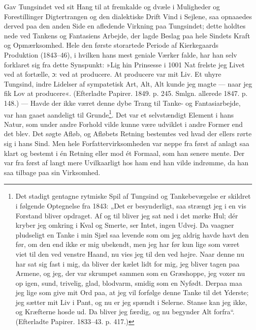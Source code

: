 \documentclass[12pt,a4paper,openany]{book}
\newcommand{\opage}[1]{\marginnote{\footnotesize\textit{[#1]}}}
\begin{document}
Gav Tungsindet ved sit Hang til at fremkalde og
dvæle i Muligheder og Forestillinger Digtertrangen og
den dialektiske Drift Vind i Sejlene, saa opnaaedes derved
paa den anden Side en afledende Virkning paa Tungsindet;
dette holdtes nede ved Tankens og Fantasiens
Arbejde, der lagde Beslag paa hele Sindets Kraft og
Opmærksomhed. Hele den første storartede Periode af
\opage{43}Kierkegaards Produktion (1843--46), i hvilken hans mest
geniale Værker falde, har han selv forklaret sig fra
dette Synspunkt: »Lig hin Prinsesse i 1001 Nat frelste
jeg Livet ved at fortælle, ɔ: ved at producere. At producere
var mit Liv. Et uhyre Tungsind, indre Lidelser
af sympatetisk Art, Alt, Alt kunde jeg magte --- naar
jeg fik Lov at producere«. (Efterladte Papirer. 1849.
p. 245. Smlgn. allerede 1847. p. 148.) --- Havde der
ikke været denne dybe Trang til Tanke- og Fantasiarbejde,
var han gaaet aandeligt til Grunde\footnote{Det stadigt gentagne rytmiske Spil af Tungsind og Tankebevægelse er skildret i følgende Optegnelse fra 1843: „Det er besynderligt, saa strængt jeg i en vis Forstand bliver opdraget. Af og til bliver jeg sat ned i det mørke Hul; dér kryber jeg omkring i Kval og Smerte, ser Intet, ingen Udvej. Da vaagner pludseligt en Tanke i min Sjæl saa levende som om jeg aldrig havde havt den før, om den end ikke er mig ubekendt, men jeg har før kun lige som været viet til den ved venstre Haand, nu vies jeg til den ved højre. Naar denne nu har sat sig fast i mig, da bliver der kælet lidt for mig, jeg bliver tagen paa Armene, og jeg, der var skrumpet sammen som en Græshoppe, jeg voxer nu op igen, sund, trivelig, glad, blodvarm, smidig som en Nyfødt. Derpaa maa jeg lige som give mit Ord paa, at jeg vil forfølge denne Tanke til det Yderste; jeg sætter mit Liv i Pant, og nu er jeg spændt i Selerne. Stanse kan jeg ikke, og Kræfterne
hosde ud. Da bliver jeg færdig, og nu begynder Alt forfra“. (Efterladte Papirer. 1833--43. p. 417.)}. Det var
et selvstændigt Element i hans Natur, som under andre
Forhold vilde kunne være udviklet i andre Former end
det blev. Det søgte Afløb, og Afløbets Retning bestemtes
ved hvad der ellers rørte sig i hans Sind. Men hele
Forfattervirksomheden var neppe fra først af anlagt saa
klart og bestemt i én Retning eller mod ét Formaal, som
han senere mente. Der var fra først af langt mere Uvilkaarligt
hos ham end han vilde indrømme, da han saa
tilbage paa sin Virksomhed.
\end{document}
